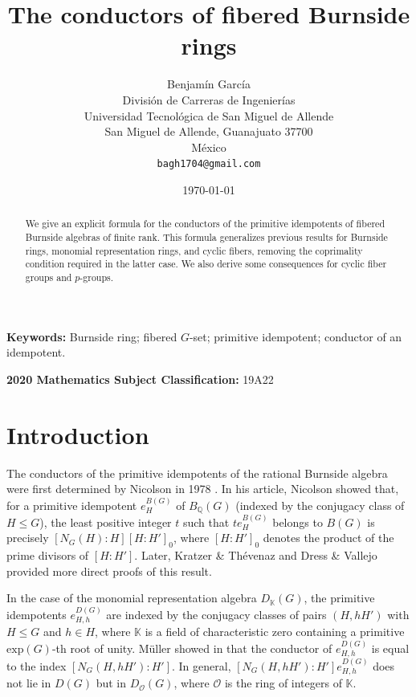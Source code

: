 \documentclass[letterpaper,12pt]{article}
\title{The conductors of fibered Burnside rings}
\author{
Benjam\'in Garc\'ia\\
Divisi\'on de Carreras de Ingenier\'ias\\
Universidad Tecnol\'ogica de San Miguel de Allende\\
San Miguel de Allende, Guanajuato 37700\\
M\'exico\\
\texttt{bagh1704@gmail.com}
}
\date{\today}
\theoremstyle{plain}
\theoremstyle{definition}
\newcommand{\Q}{\mathbb{Q}}
\newcommand{\K}{\mathbb{K}}
\begin{document}
\maketitle

\begin{abstract}
We give an explicit formula for the conductors of the primitive idempotents of fibered Burnside algebras of finite rank. This formula generalizes previous results for Burnside rings, monomial representation rings, and cyclic fibers, removing the coprimality condition required in the latter case. We also derive some consequences for cyclic fiber groups and $p$-groups.
\end{abstract}

{\bf Keywords:} Burnside ring; fibered $G$-set; primitive idempotent; conductor of an idempotent.\

{\bf 2020 Mathematics Subject Classification:} 19A22

\section*{Introduction}

The conductors of the primitive idempotents of the rational Burnside algebra were first determined by Nicolson in 1978 \cite{Nicolson}. In his article, Nicolson showed that, for a primitive idempotent $e^{B(G)}_H$ of $B_{\Q}(G)$ (indexed by the conjugacy class of $H\leq G$), the least positive integer $t$ such that $te^{B(G)}_H$ belongs to $B(G)$ is precisely $[N_G(H):H][H:H']_0$, where $[H:H']_0$ denotes the product of the prime divisors of $[H:H']$. Later, Kratzer \& Thévenaz \cite{KraThe} and Dress \& Vallejo \cite{DressVall} provided more direct proofs of this result. 

In the case of the monomial representation algebra $D_{\K}(G)$, the primitive idempotents $e^{D(G)}_{H,h}$ are indexed by the conjugacy classes of pairs $(H,hH')$ with $H\leq G$ and $h\in H$, where $\K$ is a field of characteristic zero containing a primitive $\mathrm{exp}(G)$-th root of unity. Müller showed in \cite[\S 3]{Muller} that the conductor of $e^{D(G)}_{H,h}$ is equal to the index $\left[N_G\left(H,hH'\right):H'\right]$. In general, $\left[N_G\left(H,hH'\right):H'\right]e^{D(G)}_{H,h}$ does not lie in $D(G)$ but in $D_{\mathcal{O}}(G)$, where $\mathcal{O}$ is the ring of integers of $\K$.
\end{document}
